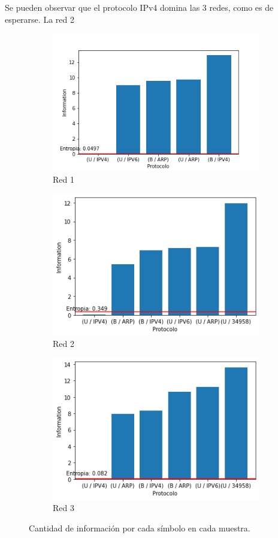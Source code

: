 Se pueden observar que el protocolo IPv4 domina las 3 redes, como es de esperarse. La red 2 


\begin{figure}[H]
    \centering
    \begin{subfigure}{0.45\linewidth}
        \includegraphics[scale=0.45]{images/resultados_diego/red_1_info.png}
        \caption{Red 1}
        \label{fig: info red 1}
    \end{subfigure}
    \begin{subfigure}{0.5\linewidth} 
        \includegraphics[scale=0.45]{images/resultados_agus/red_2_info.png}
        \caption{Red 2}
        \label{fig: info red 2}
    \end{subfigure}
    \begin{subfigure}{0.5\linewidth} 
        \centering
        \includegraphics[scale=0.45]{images/resultados_lion/red_3_info.png}
        \caption{Red 3}
        \label{fig: info red 3}
    \end{subfigure}
    \caption{Cantidad de información por cada símbolo en cada muestra.}
    \label{fig: informacion de los simbolos}
\end{figure}



